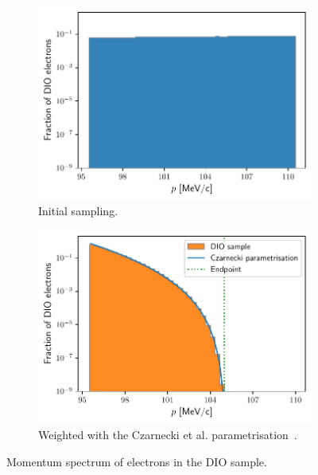 \begin{figure}
    \centering
    \begin{subfigure}[t]{0.4\textwidth}
    \includegraphics[width=\textwidth]{chapter6/dio_momentum_distribution_initial.pdf}
    \caption{Initial sampling.}
\end{subfigure}
    \hspace{2cm}
    \begin{subfigure}[t]{0.4\textwidth}
        \centering
        \includegraphics[width=\textwidth]{chapter6/dio_momentum_distribution_czarnecki_weighted.pdf}
        \caption{Weighted with the Czarnecki et al. parametrisation~\cite{czarnecki}.}
    \end{subfigure}
    \caption{Momentum spectrum of electrons in the DIO sample.}
    \label{fig:czarnecki_spectrum}
\end{figure}

